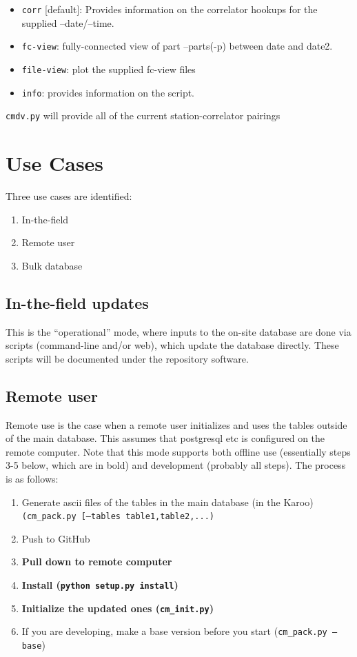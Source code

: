 \documentclass{article}[10pt]
\begin{document}
\begin{itemize}
\item {\tt corr} [default]:  Provides information on the correlator hookups for the supplied --date/--time.
\item {\tt fc-view}:  fully-connected view of part --parts(-p) between date and date2.
\item {\tt file-view}:  plot the supplied fc-view files
\item {\tt info}:  provides information on the script.
\end{itemize}

{\tt cmdv.py} will provide all of the current station-correlator pairings

\section{Use Cases}
Three use cases are identified:
\begin{enumerate}\setlength\itemsep{-.3em}
	\item In-the-field
	\item Remote user
	\item Bulk database
\end{enumerate}

\subsection{In-the-field updates}
This is the ``operational'' mode, where inputs to the on-site database are done via scripts (command-line and/or web), which update the database directly.  These scripts will be documented under the repository software.

\subsection{Remote user}
Remote use is the case when a remote user initializes and uses the tables outside of the main database.  This assumes that postgresql etc is configured on the remote computer.  Note that this mode supports both offline use (essentially steps 3-5 below, which are in bold) and development (probably all steps).  The process is as follows:
\begin{enumerate}\setlength\itemsep{-.3em}
	\item Generate ascii files of the tables in the main database (in the Karoo) {\tt (cm\_pack.py [--tables table1,table2,...)}
	\item Push to GitHub
	\item {\bf Pull down to remote computer}
	\item {\bf Install ({\tt python setup.py install})}
	\item {\bf Initialize the updated ones ({\tt cm\_init.py})}
	\item If you are developing, make a base version before you start ({\tt cm\_pack.py --base})
\end{enumerate}
\end{document}
